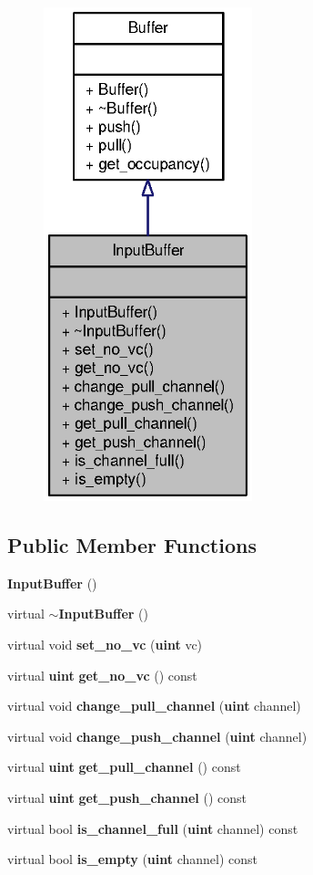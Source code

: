 \begin{figure}[H]
\begin{center}
\leavevmode
\includegraphics[width=172pt]{classInputBuffer__coll__graph}
\end{center}
\end{figure}
\subsection*{Public Member Functions}
\begin{CompactItemize}
\item 
{\bf InputBuffer} ()
\item 
virtual {\bf $\sim$InputBuffer} ()
\item 
virtual void {\bf set\_\-no\_\-vc} ({\bf uint} vc)
\item 
virtual {\bf uint} {\bf get\_\-no\_\-vc} () const 
\item 
virtual void {\bf change\_\-pull\_\-channel} ({\bf uint} channel)
\item 
virtual void {\bf change\_\-push\_\-channel} ({\bf uint} channel)
\item 
virtual {\bf uint} {\bf get\_\-pull\_\-channel} () const 
\item 
virtual {\bf uint} {\bf get\_\-push\_\-channel} () const 
\item 
virtual bool {\bf is\_\-channel\_\-full} ({\bf uint} channel) const 
\item 
virtual bool {\bf is\_\-empty} ({\bf uint} channel) const 
\end{CompactItemize}


